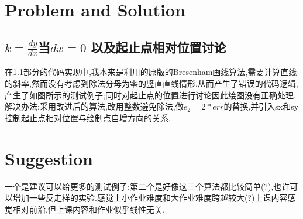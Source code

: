 \documentclass[a4paper,twoside]{article}
\begin{document}
\section{Problem and Solution}
\subsection{ $k= \frac{dy}{dx}$当$dx=0$ 以及起止点相对位置讨论}
在1.1部分的代码实现中,我本来是利用的原版的Bresenham画线算法,需要计算直线的斜率,然而没有考虑到除法分母为零的竖直直线情形,从而产生了错误的代码逻辑,产生了如图所示的测试例子;同时对起止点的位置进行讨论因此绘图没有正确处理.解决办法:采用改进后的算法,改用整数避免除法,做$e_2 = 2 * err$的替换,并引入sx和sy控制起止点相对位置与绘制点自增方向的关系.
\section{ Suggestion}
一个是建议可以给更多的测试例子;第二个是好像这三个算法都比较简单(?),也许可以增加一些反走样的实验.感觉上小作业难度和大作业难度跨越较大(?)上课内容感觉相对前沿,但上课内容和作业似乎线性无关.
\end{document}
